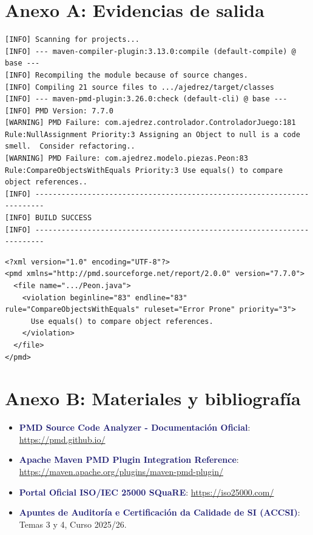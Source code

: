 \documentclass[12pt,a4paper]{article}
\newcommand{\key}[1]{\textbf{\textcolor{MidnightBlue}{#1}}}
\begin{document}
\newpage

\section*{Anexo A: Evidencias de salida}

\begin{lstlisting}[caption={Salida reducida del proceso de compilacion y PMD}]
[INFO] Scanning for projects...
[INFO] --- maven-compiler-plugin:3.13.0:compile (default-compile) @ base ---
[INFO] Recompiling the module because of source changes.
[INFO] Compiling 21 source files to .../ajedrez/target/classes
[INFO] --- maven-pmd-plugin:3.26.0:check (default-cli) @ base ---
[INFO] PMD Version: 7.7.0
[WARNING] PMD Failure: com.ajedrez.controlador.ControladorJuego:181 Rule:NullAssignment Priority:3 Assigning an Object to null is a code smell.  Consider refactoring..
[WARNING] PMD Failure: com.ajedrez.modelo.piezas.Peon:83 Rule:CompareObjectsWithEquals Priority:3 Use equals() to compare object references..
[INFO] ------------------------------------------------------------------------
[INFO] BUILD SUCCESS
[INFO] ------------------------------------------------------------------------
\end{lstlisting}

\begin{lstlisting}[language=XMLext,caption={Detalle de los hallazgos en target/pmd.xml}]
<?xml version="1.0" encoding="UTF-8"?>
<pmd xmlns="http://pmd.sourceforge.net/report/2.0.0" version="7.7.0">
  <file name=".../Peon.java">
    <violation beginline="83" endline="83" rule="CompareObjectsWithEquals" ruleset="Error Prone" priority="3">
      Use equals() to compare object references.
    </violation>
  </file>
</pmd>
\end{lstlisting}

\section*{Anexo B: Materiales y bibliografía}

\begin{itemize}[noitemsep]
    \item \key{PMD Source Code Analyzer - Documentación Oficial}: \url{https://pmd.github.io/}
    \item \key{Apache Maven PMD Plugin Integration Reference}: \url{https://maven.apache.org/plugins/maven-pmd-plugin/}
    \item \key{Portal Oficial ISO/IEC 25000 SQuaRE}: \url{https://iso25000.com/}
    \item \key{Apuntes de Auditoría e Certificación da Calidade de SI (ACCSI)}: Temas 3 y 4, Curso 2025/26.
\end{itemize}
\end{document}
